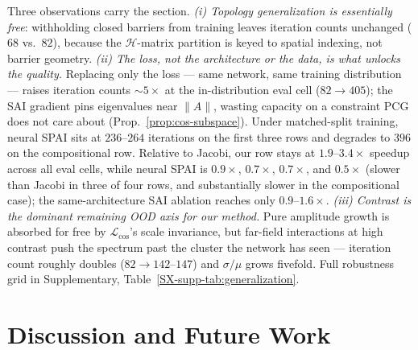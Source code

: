 \documentclass[acmtog]{acmart}
\theoremstyle{plain}
\begin{document}
Three observations carry the section. \emph{(i) Topology generalization is
essentially free}: withholding closed barriers from training leaves iteration
counts unchanged ($68$ vs.\ $82$), because the $\mathcal{H}$-matrix partition is
keyed to spatial indexing, not barrier geometry. \emph{(ii) The loss, not the
architecture or the data, is what unlocks the quality.} Replacing only the loss
--- same network, same training distribution --- raises iteration counts
$\sim\!5\times$ at the in-distribution eval cell ($82\!\to\!405$); the SAI
gradient pins eigenvalues near $\|A\|$, wasting capacity on a constraint PCG
does not care about (Prop.~\ref{prop:cos-subspace}). Under matched-split training,
neural SPAI sits at $236$--$264$ iterations on the first three rows and degrades to
$396$ on the compositional row. Relative to Jacobi, our row stays at
$1.9$--$3.4\times$ speedup across all eval cells, while neural SPAI is
$0.9\times$, $0.7\times$, $0.7\times$, and $0.5\times$ (slower than Jacobi in
three of four rows, and substantially slower in the compositional case); the
same-architecture SAI ablation reaches only $0.9$--$1.6\times$. \emph{(iii) Contrast is the dominant
remaining OOD axis for our method.} Pure amplitude growth is absorbed for free
by $\mathcal{L}_{\cos}$'s scale invariance, but far-field interactions at high
contrast push the spectrum past the cluster the network has seen --- iteration
count roughly doubles ($82\!\to\!142$--$147$) and $\sigma/\mu$ grows fivefold.
Full robustness grid in Supplementary, Table~\ref{SX-supp-tab:generalization}.

\section{Discussion and Future Work}
\label{sec:limitations}
\end{document}
